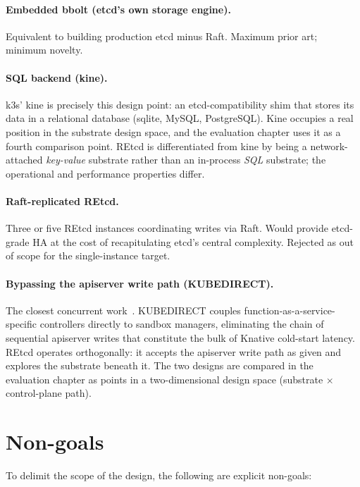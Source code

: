 \paragraph{Embedded bbolt (etcd's own storage engine).}
Equivalent to building production etcd minus Raft. Maximum prior art; minimum novelty.

\paragraph{SQL backend (kine).}
k3s' kine is precisely this design point: an etcd-compatibility shim that stores its data in a relational database (sqlite, MySQL, PostgreSQL). Kine occupies a real position in the substrate design space, and the evaluation chapter uses it as a fourth comparison point. REtcd is differentiated from kine by being a network-attached \emph{key-value} substrate rather than an in-process \emph{SQL} substrate; the operational and performance properties differ.

\paragraph{Raft-replicated REtcd.}
Three or five REtcd instances coordinating writes via Raft. Would provide etcd-grade HA at the cost of recapitulating etcd's central complexity. Rejected as out of scope for the single-instance target.

\paragraph{Bypassing the apiserver write path (KUBEDIRECT).}
The closest concurrent work~\cite{wang2026kubedirect}.%
KUBEDIRECT couples function-as-a-service-specific controllers directly to sandbox managers, eliminating the chain of sequential apiserver writes that constitute the bulk of Knative cold-start latency. REtcd operates orthogonally: it accepts the apiserver write path as given and explores the substrate beneath it. The two designs are compared in the evaluation chapter as points in a two-dimensional design space (substrate $\times$ control-plane path).

\section{Non-goals}
\label{sec:design-nongoals}

To delimit the scope of the design, the following are explicit non-goals:

